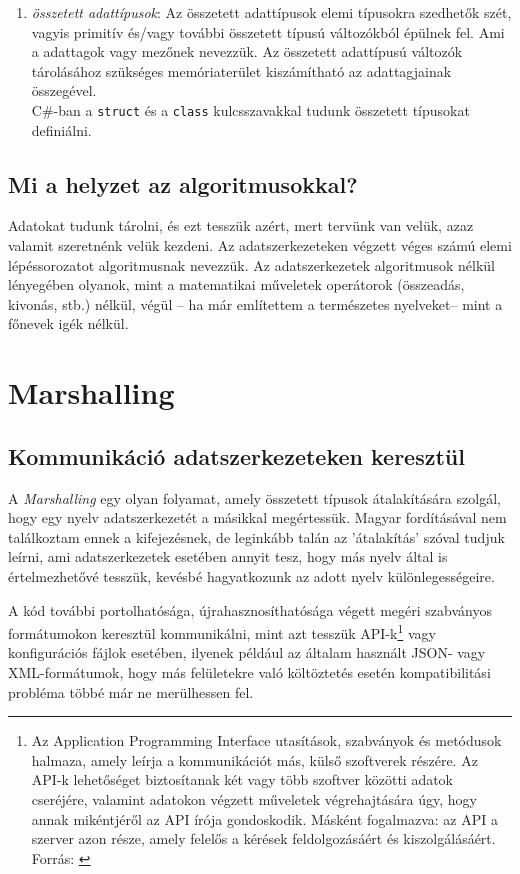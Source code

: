 \documentclass[tocnopagenum]{thesis-ekf}
\theoremstyle{definition}
\theoremstyle{remark}
\begin{document}
\begin{enumerate}[label=\alph*)]
\begin{enumerate}
\begin{tabular}{cc}
			\end{tabular}
		\end{enumerate}
		\item \emph{összetett adattípusok}: Az összetett adattípusok elemi típusokra szedhetők szét, vagyis primitív és/vagy további összetett típusú változókból épülnek fel. Ami a adattagok vagy mezőnek nevezzük. Az összetett adattípusú változók tárolásához szükséges memóriaterület kiszámítható az adattagjainak összegével.\\
		C\#-ban a \verb*|struct| és a \verb*|class| kulcsszavakkal tudunk összetett típusokat definiálni.
	\end{enumerate}
	\section{Mi a helyzet az algoritmusokkal?}
	Adatokat tudunk tárolni, és ezt tesszük azért, mert tervünk van velük, azaz valamit szeretnénk velük kezdeni. Az adatszerkezeteken végzett véges számú elemi lépéssorozatot algoritmusnak nevezzük. Az adatszerkezetek algoritmusok nélkül lényegében olyanok, mint a matematikai műveletek operátorok (összeadás, kivonás, stb.) nélkül, végül -- ha már említettem a természetes nyelveket-- mint a főnevek igék nélkül.

	
	\chapter{Marshalling}
	\section{Kommunikáció adatszerkezeteken keresztül}
	A \emph{Marshalling} egy olyan folyamat, amely összetett típusok átalakítására szolgál, hogy egy nyelv adatszerkezetét a másikkal megértessük. Magyar fordításával nem találkoztam ennek a kifejezésnek, de leginkább talán az 'átalakítás' szóval tudjuk leírni, ami adatszerkezetek esetében annyit tesz, hogy más nyelv által is értelmezhetővé tesszük, kevésbé hagyatkozunk az adott nyelv különlegességeire.\cite{sof_marshalling}
	\par
	A kód további portolhatósága, újrahasznosíthatósága végett megéri szabványos formátumokon keresztül kommunikálni, mint azt tesszük API-k\footnote{Az Application Programming Interface utasítások, szabványok és metódusok halmaza, amely leírja a kommunikációt más, külső szoftverek részére. Az API-k lehetőséget biztosítanak két vagy több szoftver közötti adatok cseréjére, valamint adatokon végzett műveletek végrehajtására úgy, hogy annak mikéntjéről az API írója gondoskodik. Másként fogalmazva: az API a szerver azon része, amely felelős a kérések feldolgozásáért és kiszolgálásáért. Forrás: \cite{api}} vagy konfigurációs fájlok esetében, ilyenek például az általam használt JSON- vagy XML-formátumok,  hogy más felületekre való költöztetés esetén kompatibilitási probléma többé már ne merülhessen fel.
\end{document}

